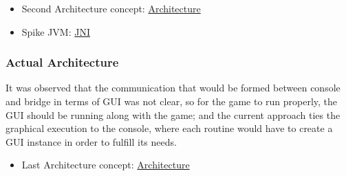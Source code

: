 \documentclass[a4paper,12pt]{article}
\begin{document}
\begin{itemize}
    \item Second Architecture concept: \href{https://github.com/Pending-Name-21/arquitecture/pull/5}{Architecture}
    \item Spike JVM: \href{https://tree.taiga.io/project/joseluis-teran-coffeetime/us/2?milestone=390348}{JNI}
\end{itemize}

\subsubsection{Actual Architecture}
It was observed that the communication that would be formed between console and bridge in terms of GUI was not clear, so for the game to run properly, the GUI should be running along with the game; and the current approach ties the graphical execution to the console, where each routine would have to create a GUI instance in order to fulfill its needs.

\begin{itemize}
    \item Last Architecture concept: \href{https://github.com/Pending-Name-21/arquitecture/pull/12}{Architecture}
\end{itemize}
\end{document}
